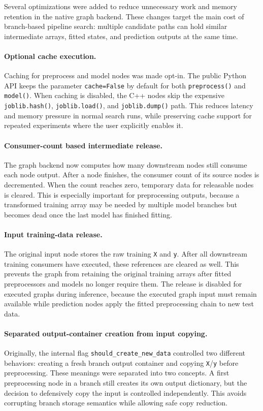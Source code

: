 \documentclass[11pt,a4paper]{article}
\begin{document}
Several optimizations were added to reduce unnecessary work and memory
retention in the native graph backend. These changes target the main cost of
branch-based pipeline search: multiple candidate paths can hold similar
intermediate arrays, fitted states, and prediction outputs at the same time.

\paragraph{Optional cache execution.}
Caching for preprocess and model nodes was made opt-in. The public Python API
keeps the parameter \texttt{cache=False} by default for both
\texttt{preprocess()} and \texttt{model()}. When caching is disabled, the C++
nodes skip the expensive \texttt{joblib.hash()}, \texttt{joblib.load()}, and
\texttt{joblib.dump()} path. This reduces latency and memory pressure in normal
search runs, while preserving cache support for repeated experiments where the
user explicitly enables it.

\paragraph{Consumer-count based intermediate release.}
The graph backend now computes how many downstream nodes still consume each
node output. After a node finishes, the consumer count of its source nodes is
decremented. When the count reaches zero, temporary data for releasable nodes
is cleared. This is especially important for preprocessing outputs, because a
transformed training array may be needed by multiple model branches but becomes
dead once the last model has finished fitting.

\paragraph{Input training-data release.}
The original input node stores the raw training \texttt{X} and \texttt{y}.
After all downstream training consumers have executed, these references are
cleared as well. This prevents the graph from retaining the original training
arrays after fitted preprocessors and models no longer require them. The
release is disabled for executed graphs during inference, because the executed
graph input must remain available while prediction nodes apply the fitted
preprocessing chain to new test data.

\paragraph{Separated output-container creation from input copying.}
Originally, the internal flag \texttt{should\_create\_new\_data} controlled two
different behaviors: creating a fresh branch output container and copying
\texttt{X}/\texttt{y} before preprocessing. These meanings were separated into
two concepts. A first preprocessing node in a branch still creates its own
output dictionary, but the decision to defensively copy the input is controlled
independently. This avoids corrupting branch storage semantics while allowing
safe copy reduction.
\end{document}
